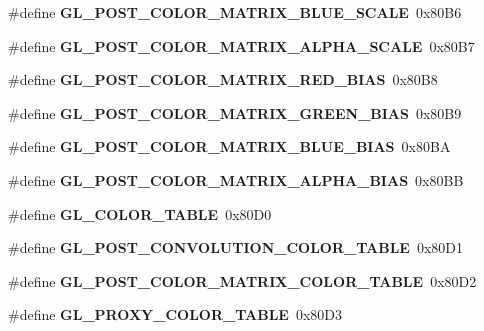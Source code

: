 \begin{DoxyCompactItemize}
\item 
\#define {\bfseries G\+L\+\_\+\+P\+O\+S\+T\+\_\+\+C\+O\+L\+O\+R\+\_\+\+M\+A\+T\+R\+I\+X\+\_\+\+B\+L\+U\+E\+\_\+\+S\+C\+A\+L\+E}~0x80\+B6\label{_s_d_l__opengl_8h_a422df7e6dfd366de9f78e790bb60d813}

\item 
\#define {\bfseries G\+L\+\_\+\+P\+O\+S\+T\+\_\+\+C\+O\+L\+O\+R\+\_\+\+M\+A\+T\+R\+I\+X\+\_\+\+A\+L\+P\+H\+A\+\_\+\+S\+C\+A\+L\+E}~0x80\+B7\label{_s_d_l__opengl_8h_a501b391e69fd678e081402dc457233c2}

\item 
\#define {\bfseries G\+L\+\_\+\+P\+O\+S\+T\+\_\+\+C\+O\+L\+O\+R\+\_\+\+M\+A\+T\+R\+I\+X\+\_\+\+R\+E\+D\+\_\+\+B\+I\+A\+S}~0x80\+B8\label{_s_d_l__opengl_8h_a47acaeed7320bc1c6bce0fee1fa2d5d5}

\item 
\#define {\bfseries G\+L\+\_\+\+P\+O\+S\+T\+\_\+\+C\+O\+L\+O\+R\+\_\+\+M\+A\+T\+R\+I\+X\+\_\+\+G\+R\+E\+E\+N\+\_\+\+B\+I\+A\+S}~0x80\+B9\label{_s_d_l__opengl_8h_a3156ca5678724982c303956e282a8d55}

\item 
\#define {\bfseries G\+L\+\_\+\+P\+O\+S\+T\+\_\+\+C\+O\+L\+O\+R\+\_\+\+M\+A\+T\+R\+I\+X\+\_\+\+B\+L\+U\+E\+\_\+\+B\+I\+A\+S}~0x80\+B\+A\label{_s_d_l__opengl_8h_aee6e70167ae07c1e9281687f85e9bf13}

\item 
\#define {\bfseries G\+L\+\_\+\+P\+O\+S\+T\+\_\+\+C\+O\+L\+O\+R\+\_\+\+M\+A\+T\+R\+I\+X\+\_\+\+A\+L\+P\+H\+A\+\_\+\+B\+I\+A\+S}~0x80\+B\+B\label{_s_d_l__opengl_8h_a5b08611083e7ee30f7d2219a79f292a9}

\item 
\#define {\bfseries G\+L\+\_\+\+C\+O\+L\+O\+R\+\_\+\+T\+A\+B\+L\+E}~0x80\+D0\label{_s_d_l__opengl_8h_a15ed9454505d8ed1b3f3598d231ed9fc}

\item 
\#define {\bfseries G\+L\+\_\+\+P\+O\+S\+T\+\_\+\+C\+O\+N\+V\+O\+L\+U\+T\+I\+O\+N\+\_\+\+C\+O\+L\+O\+R\+\_\+\+T\+A\+B\+L\+E}~0x80\+D1\label{_s_d_l__opengl_8h_aa497771906b9d63ecd2e43db2fa96283}

\item 
\#define {\bfseries G\+L\+\_\+\+P\+O\+S\+T\+\_\+\+C\+O\+L\+O\+R\+\_\+\+M\+A\+T\+R\+I\+X\+\_\+\+C\+O\+L\+O\+R\+\_\+\+T\+A\+B\+L\+E}~0x80\+D2\label{_s_d_l__opengl_8h_a2befa03ff3c64e5bfd7f870f546fcbb4}

\item 
\#define {\bfseries G\+L\+\_\+\+P\+R\+O\+X\+Y\+\_\+\+C\+O\+L\+O\+R\+\_\+\+T\+A\+B\+L\+E}~0x80\+D3\label{_s_d_l__opengl_8h_afa0aeb76019d88f6aabdd78bd9f99255}


\end{DoxyCompactItemize}
